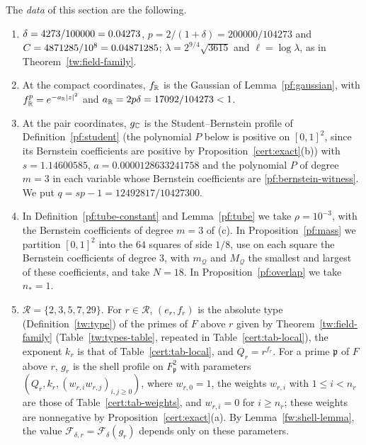 \begin{definition}\label{cert:data}
The \emph{data} of this section are the following.
\begin{enumerate}
\item[(a)] $\delta=4273/100000=0.04273$, $p=2/(1+\delta)=200000/104273$
and $C=4871285/10^8=0.04871285$; $\lambda=2^{9/4}\sqrt{3615}$ and
$\ell=\log\lambda$, as in Theorem~\ref{tw:field-family}.
\item[(b)] At the compact coordinates, $f_\mathbb R$ is the Gaussian of
Lemma~\ref{pf:gaussian}, with $f_\mathbb R^p=e^{-a_\mathbb R|z|^2}$ and
$a_\mathbb R=2p\delta=17092/104273<1$.
\item[(c)] At the pair coordinates, $g_\mathbb C$ is the Student--Bernstein
profile of Definition~\ref{pf:student} (the polynomial $P$ below is
positive on $[0,1]^2$, since its Bernstein coefficients are positive by
Proposition~\ref{cert:exact}(b)) with $s=1.14600585$,
$a=0.0000128633241758$ and the polynomial $P$ of degree $m=3$ in each
variable whose Bernstein coefficients are \eqref{pf:bernstein-witness}.
We put $q=sp-1=12492817/10427300$.
\item[(d)] In Definition~\ref{pf:tube-constant} and Lemma~\ref{pf:tube}
we take $\rho=10^{-3}$, with the Bernstein coefficients of degree $m=3$
of (c). In Proposition~\ref{pf:mass} we partition $[0,1]^2$ into the
$64$ squares of side $1/8$, use on each square the Bernstein
coefficients of degree $3$, with $m_{\mathcal Q}$ and $M_{\mathcal Q}$
the smallest and largest of these coefficients, and take $N=18$. In
Proposition~\ref{pf:overlap} we take $n_*=1$.
\item[(e)] $\mathcal R=\{2,3,5,7,29\}$. For $r\in\mathcal R$, $(e_r,f_r)$
is the absolute type (Definition~\ref{tw:type}) of the primes of $F$
above $r$ given by Theorem~\ref{tw:field-family}
(Table~\ref{tw:types-table}, repeated in Table~\ref{cert:tab-local}),
the exponent $k_r$ is that of Table~\ref{cert:tab-local}, and
$Q_r=r^{f_r}$. For a prime $\mathfrak p$ of $F$ above $r$, $g_r$ is the
shell profile on $F_{\mathfrak p}^2$ with parameters
$(Q_r,k_r,(w_{r,i}w_{r,j})_{i,j\ge0})$, where $w_{r,0}=1$, the weights
$w_{r,i}$ with $1\le i<n_r$ are those of Table~\ref{cert:tab-weights},
and $w_{r,i}=0$ for $i\ge n_r$; these weights are nonnegative by
Proposition~\ref{cert:exact}(a). By Lemma~\ref{fw:shell-lemma}, the
value $\mathcal F_{\delta,r}=\mathcal F_\delta(g_r)$ depends only on these
parameters.
\end{enumerate}
\end{definition}

